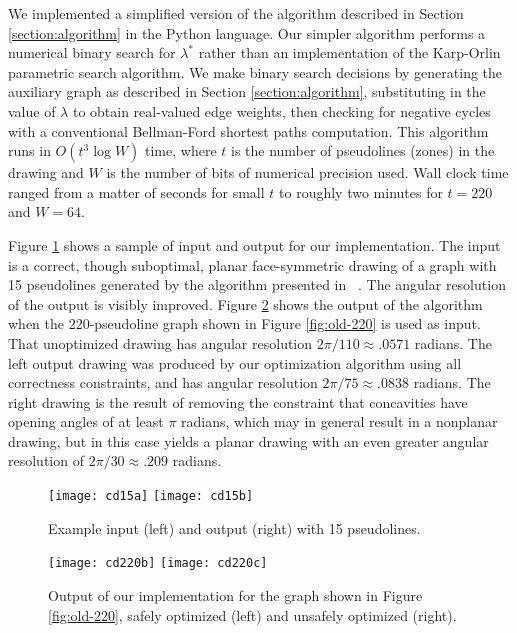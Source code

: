 \documentclass[11pt,letter]{article}
\begin{document}
We implemented a simplified version of the algorithm described in Section \ref{section:algorithm} in the Python language.  Our simpler algorithm performs a numerical binary search for $\lambda^*$ rather than an implementation of the Karp-Orlin parametric search algorithm.  We make binary search decisions by generating the auxiliary graph as described in Section \ref{section:algorithm}, substituting in the value of $\lambda$ to obtain real-valued edge weights, then checking for negative cycles with a conventional Bellman-Ford shortest paths computation.  This algorithm runs in $O(t^3 \log W)$ time, where $t$ is the number of pseudolines (zones) in the drawing and $W$ is the number of bits of numerical precision used.  Wall clock time ranged from a matter of seconds for small $t$ to roughly two minutes for $t=220$ and $W=64$.

Figure \ref{figure:cd15} shows a sample of input and output for our implementation.  The input is a correct, though suboptimal, planar face-symmetric drawing of a graph with 15 pseudolines generated by the algorithm presented in ~\cite{Epp-GD-04}.  The angular resolution of the output is visibly improved.  Figure \ref{figure:cd220} shows the output of the algorithm when the 220-pseudoline graph shown in Figure \ref{fig:old-220} is used as input.  That unoptimized drawing has angular resolution $2\pi/110 \approx .0571$ radians.  The left output drawing was produced by our optimization algorithm using all correctness constraints, and has angular resolution $2\pi/75\approx .0838$ radians.  The right drawing is the result of removing the constraint that concavities have opening angles of at least $\pi$ radians, which may in general result in a nonplanar drawing, but in this case yields a planar drawing with an even greater angular resolution of $2\pi/30\approx .209$ radians.

\begin{figure}[t]
\centering
\texttt{[image: cd15a]} \texttt{[image: cd15b]}
\caption{Example input (left) and output (right) with 15 pseudolines.}
\label{figure:cd15}
\end{figure}

\begin{figure}[t]
\centering
\texttt{[image: cd220b]} \texttt{[image: cd220c]}
\caption{Output of our implementation for the graph shown in Figure \ref{fig:old-220}, safely optimized (left) and unsafely optimized (right).}
\label{figure:cd220}
\end{figure}
\end{document}
